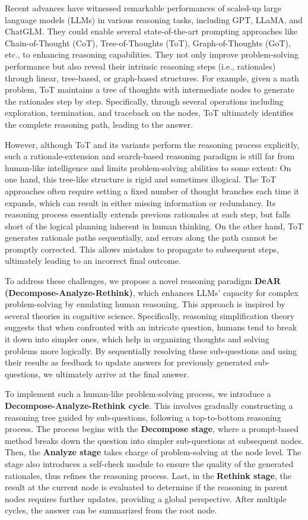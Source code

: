 \documentclass{article}
\begin{document}
Recent advances have witnessed remarkable performances of scaled-up large language models (LLMs) in various reasoning tasks, including GPT, LLaMA, and ChatGLM. They could enable several state-of-the-art prompting approaches like Chain-of-Thought (CoT), Tree-of-Thoughts (ToT), Graph-of-Thoughts (GoT), etc., to enhancing reasoning capabilities. They not only improve problem-solving performance but also reveal their intrinsic reasoning steps (i.e., rationales) through linear, tree-based, or graph-based structures. For example, given a math problem, ToT maintains a tree of thoughts with intermediate nodes to generate the rationales step by step. Specifically, through several operations including exploration, termination, and traceback on the nodes, ToT ultimately identifies the complete reasoning path, leading to the answer.

However, although ToT and its variants perform the reasoning process explicitly, such a rationale-extension and search-based reasoning paradigm is still far from human-like intelligence and limits problem-solving abilities to some extent: On one hand, this tree-like structure is rigid and sometimes illogical. The ToT approaches often require setting a fixed number of thought branches each time it expands, which can result in either missing information or redundancy. Its reasoning process essentially extends previous rationales at each step, but falls short of the logical planning inherent in human thinking. On the other hand, ToT generates rationale paths sequentially, and errors along the path cannot be promptly corrected. This allows mistakes to propagate to subsequent steps, ultimately leading to an incorrect final outcome.

To address these challenges, we propose a novel reasoning paradigm \textbf{DeAR (Decompose-Analyze-Rethink)}, which enhances LLMs' capacity for complex problem-solving by emulating human reasoning. This approach is inspired by several theories in cognitive science. Specifically, reasoning simplification theory suggests that when confronted with an intricate question, humans tend to break it down into simpler ones, which help in organizing thoughts and solving problems more logically. By sequentially resolving these sub-questions and using their results as feedback to update answers for previously generated sub-questions, we ultimately arrive at the final answer.

To implement such a human-like problem-solving process, we introduce a \textbf{Decompose-Analyze-Rethink cycle}. This involves gradually constructing a reasoning tree guided by sub-questions, following a top-to-bottom reasoning process. The process begins with the \textbf{Decompose stage}, where a prompt-based method breaks down the question into simpler sub-questions at subsequent nodes. Then, the \textbf{Analyze stage} takes charge of problem-solving at the node level. The stage also introduces a self-check module to ensure the quality of the generated rationales, thus refines the reasoning process. Last, in the \textbf{Rethink stage}, the result at the current node is evaluated to determine if the reasoning in parent nodes requires further updates, providing a global perspective. After multiple cycles, the answer can be summarized from the root node.
\end{document}
